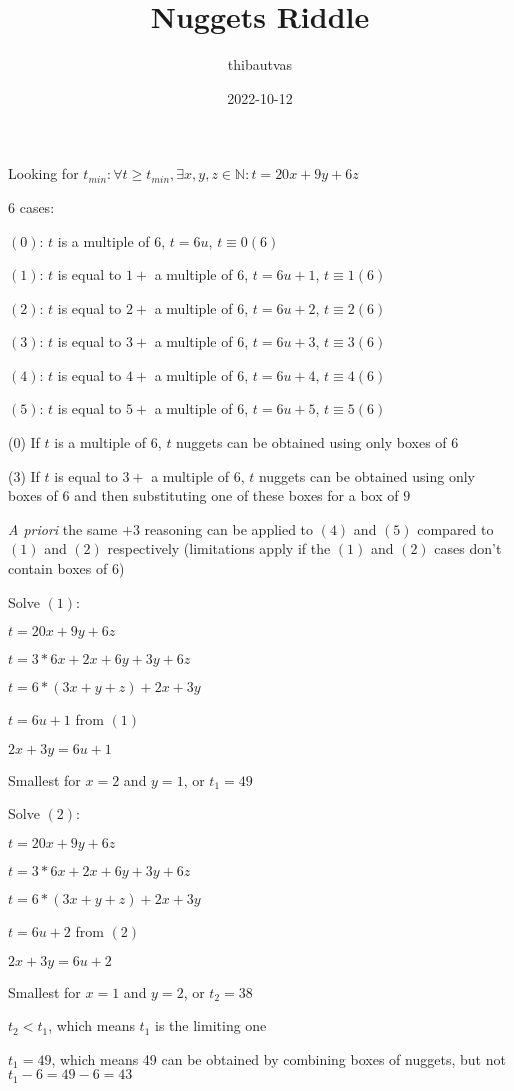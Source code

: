 \documentclass{article}
\title{Nuggets Riddle}
\author{thibautvas}
\date{2022-10-12}
\begin{document}
Looking for $t_{min}: \forall t \geq t_{min}, \exists x, y, z \in \mathbb{N}: t = 20x + 9y + 6z$

6 cases:

$(0)$: $t$ is a multiple of $6$, $t = 6u$, $t \equiv 0(6)$

$(1)$: $t$ is equal to $1 +$ a multiple of $6$, $t = 6u + 1$, $t \equiv 1(6)$

$(2)$: $t$ is equal to $2 +$ a multiple of $6$, $t = 6u + 2$, $t \equiv 2(6)$

$(3)$: $t$ is equal to $3 +$ a multiple of $6$, $t = 6u + 3$, $t \equiv 3(6)$

$(4)$: $t$ is equal to $4 +$ a multiple of $6$, $t = 6u + 4$, $t \equiv 4(6)$

$(5)$: $t$ is equal to $5 +$ a multiple of $6$, $t = 6u + 5$, $t \equiv 5(6)$

\medskip

(0) If $t$ is a multiple of $6$, $t$ nuggets can be obtained using only boxes of $6$

(3) If $t$ is equal to $3 +$ a multiple of $6$, $t$ nuggets can be obtained using only boxes of $6$ and then substituting one of these boxes for a box of $9$

\textit{A priori} the same $+3$ reasoning can be applied to $(4)$ and $(5)$ compared to $(1)$ and $(2)$ respectively (limitations apply if the $(1)$ and $(2)$ cases don't contain boxes of $6$)

\medskip

Solve $(1)$:

$t = 20x + 9y + 6z$

$t = 3 * 6x + 2x + 6y + 3y + 6z$

$t = 6 * (3x + y + z) + 2x + 3y$

$t = 6u + 1$ from $(1)$

$2x + 3y = 6u + 1$

Smallest for $x = 2$ and $y = 1$, or $t_1 = 49$

Solve $(2)$:

$t = 20x + 9y + 6z$

$t = 3 * 6x + 2x + 6y + 3y + 6z$

$t = 6 * (3x + y + z) + 2x + 3y$

$t = 6u + 2$ from $(2)$

$2x + 3y = 6u + 2$

Smallest for $x = 1$ and $y = 2$, or $t_2 = 38$

$t_2 < t_1$, which means $t_1$ is the limiting one

$t_1 = 49$, which means 49 can be obtained by combining boxes of nuggets, but not $t_1 - 6 = 49 - 6 = 43$
\end{document}
